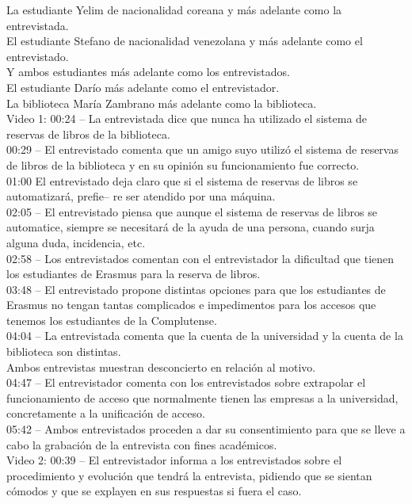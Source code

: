 \documentclass[12pt]{article}
\begin{document}
La estudiante Yelim de nacionalidad coreana y más adelante como la entrevistada.\\ 
El estudiante Stefano de nacionalidad venezolana y más adelante como el entrevistado.\\
Y ambos estudiantes más adelante como los entrevistados.\\
El estudiante Darío más adelante como el entrevistador.\\
La biblioteca María Zambrano más adelante como la biblioteca.\\ 
Video 1: 
00:24 – La entrevistada dice que nunca ha utilizado el sistema de reservas de libros de la biblioteca.\\
00:29 – El entrevistado comenta que un amigo suyo utilizó el sistema de reservas de libros de la biblioteca y en su opinión su funcionamiento fue correcto.\\
01:00 El entrevistado deja claro que si el sistema de reservas de libros se automatizará, prefie– re ser atendido por una máquina.\\
02:05 – El entrevistado piensa que aunque el sistema de reservas de libros se automatice, siempre se necesitará de la ayuda de una persona, cuando surja alguna duda, incidencia, etc.\\
02:58 – Los entrevistados comentan con el entrevistador la dificultad que tienen los estudiantes de Erasmus para la reserva de libros.\\
03:48 – El entrevistado propone distintas opciones para que los estudiantes de Erasmus no tengan tantas complicados e impedimentos para los accesos que tenemos los estudiantes de la Complutense.\\ 
04:04 – La entrevistada comenta que la cuenta de la universidad y la cuenta de la biblioteca son distintas.\\ Ambos entrevistas muestran desconcierto en relación al motivo.\\
04:47 – El entrevistador comenta con los entrevistados sobre extrapolar el funcionamiento de acceso que normalmente tienen las empresas a la universidad, concretamente a la unificación de acceso.\\
05:42 – Ambos entrevistados proceden a dar su consentimiento para que se lleve a cabo la grabación de la entrevista con fines académicos.\\  
Video 2: 
00:39 – El entrevistador informa a los entrevistados sobre el procedimiento y evolución que tendrá la entrevista, pidiendo que se sientan cómodos y que se explayen en sus respuestas si fuera el caso.\\
\end{document}
